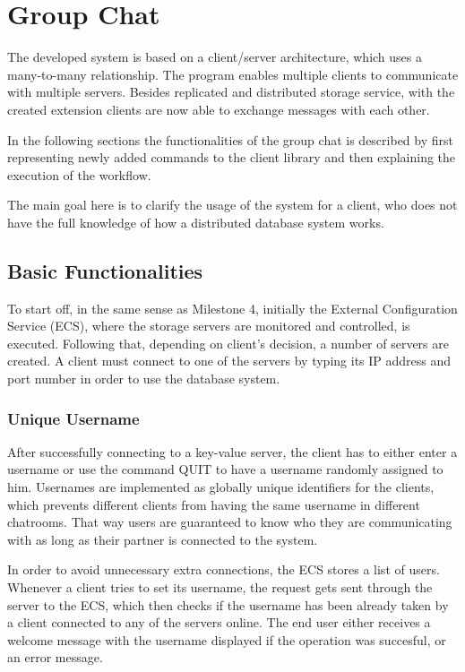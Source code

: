 \section{Group Chat}
\label{sec:groupchat}

The developed system is based on a client/server architecture, which uses a many-to-many relationship. The program enables multiple clients to communicate with multiple servers. Besides replicated and distributed storage service, with the created extension clients are now able to exchange messages with each other.

In the following sections the functionalities of the group chat is described by first representing newly added commands to the client library and then explaining the execution of the workflow.

The main goal here is to clarify the usage of the system for a client, who does not have the full knowledge of how a distributed database system works.

\subsection{Basic Functionalities}
\label{sec:groupchat_executionoftheworkflow}

To start off, in the same sense as Milestone 4, initially the External Configuration Service (ECS), where the storage servers are monitored and controlled, is executed. Following that, depending on client's decision, a number of servers are created. A client must connect to one of the servers by typing its IP address and port number in order to use the database system.

\subsubsection{Unique Username}
\label{sec:groupchat_executionoftheworkflow_uniqueusername}
After successfully connecting to a key-value server, the client has to either enter a username or use the command QUIT to have a username randomly assigned to him. Usernames are implemented as globally unique identifiers for the clients, which prevents different clients from having the same username in different chatrooms. That way users are guaranteed to know who they are communicating with as long as their partner is connected to the system. 

In order to avoid unnecessary extra connections, the ECS stores a list of users. Whenever a client tries to set its username, the request gets sent through the server to the ECS, which then checks if the username has been already taken by a client connected to any of the servers online. The end user either receives a welcome message with the username displayed if the operation was succesful, or an error message.
 
